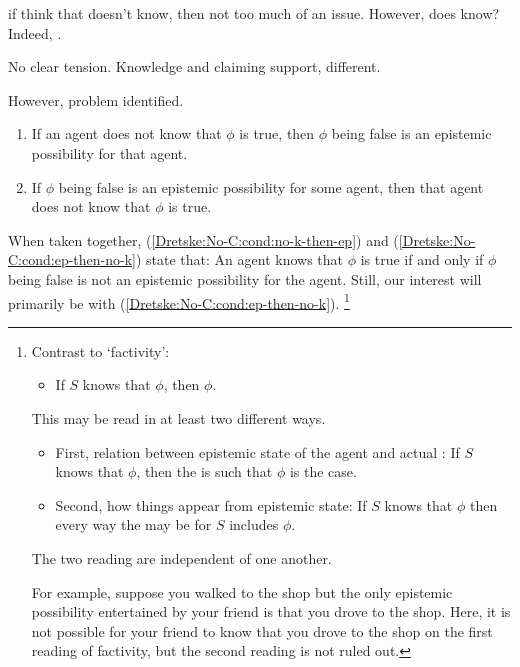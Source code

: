 \begin{note}
  if think that doesn't know, then not too much of an issue.
  However, does know?
  Indeed, \citeauthor{Dretske:1970to}.

  No clear tension.
  Knowledge and claiming support, different.

  However, problem identified.
\end{note}

\begin{note}
  \begin{enumerate}[label=K\Alph*., ref=K\Alph*]
  \item\label{Dretske:No-C:cond:no-k-then-ep} If an agent does not know that \(\phi\) is true, then \(\phi\) being false is an epistemic possibility for that agent.
  \item\label{Dretske:No-C:cond:ep-then-no-k} If \(\phi\) being false is an epistemic possibility for some agent, then that agent does not know that \(\phi\) is true.
  \end{enumerate}
  When taken together, (\ref{Dretske:No-C:cond:no-k-then-ep}) and (\ref{Dretske:No-C:cond:ep-then-no-k}) state that: An agent knows that \(\phi\) is true if and only if \(\phi\) being false is not an epistemic possibility for the agent.
  Still, our interest will primarily be with (\ref{Dretske:No-C:cond:ep-then-no-k}).\nolinebreak
  \footnote{
    \label{fn:factivity-two-readings}
    Contrast to `factivity':
    \begin{itemize}
    \item If \(S\) knows that \(\phi\), then \(\phi\).
    \end{itemize}
    This may be read in at least two different ways.
    \begin{itemize}
    \item First, relation between epistemic state of the agent and actual \world{}:\newline
      \mbox{} \qquad If \(S\) knows that \(\phi\), then the \world{} is such that \(\phi\) is the case.
    \item Second, how things appear from epistemic state:\newline
      \mbox{} \qquad If \(S\) knows that \(\phi\) then every way the \world{} may be for \(S\) includes \(\phi\).
    \end{itemize}

    The two reading are independent of one another.

    For example, suppose you walked to the shop but the only epistemic possibility entertained by your friend is that you drove to the shop.
    Here, it is not possible for your friend to know that you drove to the shop on the first reading of factivity, but the second reading is not ruled out.

}
\end{note}

